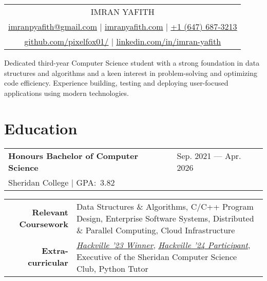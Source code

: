 \documentclass[a4paper, 12pt]{article}
\begin{document}
\color{regtextgray} %
\pagestyle{empty} %

\begin{tabularx}{\linewidth}{@{} C @{}}
    \Huge{IMRAN YAFITH}                                                                       \\[6pt]
    \underline{\href{mailto:imranpyafith@gmail.com}{\raisebox{-0.05\height}{\faEnvelope} imranpyafith@gmail.com}} $|$
    \underline{\href{https://imranyafith.com/}{\raisebox{-0.05\height}{\faGlobe} imranyafith.com}} $|$
    \underline{\href{tel:+16476873213}{\raisebox{-0.05\height}{\faMobile} +1 (647) 687-3213}} \\
    \underline{\href{https://github.com/pixelfox01}{\raisebox{-0.05\height}{\faGithub} github.com/pixelfox01/}} $|$
    \underline{\href{https://www.linkedin.com/in/imran-yafith-95a437266/}{\raisebox{-0.05\height}{\faLinkedin} linkedin.com/in/imran-yafith}}
\end{tabularx}

\begin{center}
    \fontsize{11pt}{12pt}\selectfont
    Dedicated third-year Computer Science student with a strong foundation in data structures and algorithms and a keen interest in problem-solving and optimizing code efficiency.
    Experience building, testing and deploying user-focused applications using modern technologies.
\end{center}

\section{Education}
\begin{tabularx}{\linewidth}{ @{}l X@{} }
    \textcolor{imptextblack}{\textbf{Honours Bachelor of Computer Science}} & \hfill Sep. 2021 --- Apr. 2026 \\
    \small{Sheridan College $|$ GPA:\ 3.82}
\end{tabularx}
\begin{center}
    \begin{tabular}{@{} r @{\hspace{2em}} p{} @{}}
        \textcolor{imptextblack}{\textbf{Relevant Coursework}} & Data Structures \& Algorithms, C/C++ Program Design, Enterprise Software Systems, Distributed \& Parallel Computing, Cloud Infrastructure                                                                                                 \\
        \textcolor{imptextblack}{\textbf{Extra-curricular}}    & \href{https://devpost.com/software/cybernexus}{\textit{Hackville '23 Winner}}, \href{https://devpost.com/software/pitchperfect-teu3zs}{\textit{Hackville '24 Participant}}, Executive of the Sheridan Computer Science Club, Python Tutor \\
    \end{tabular}
\end{center}
\end{document}
